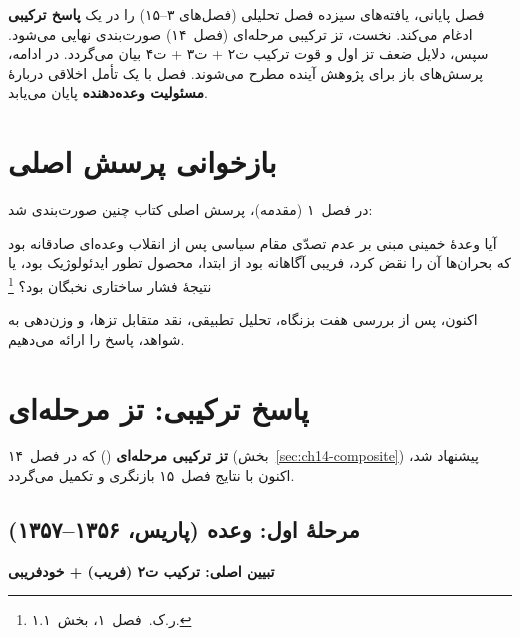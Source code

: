 \documentclass[12pt,a4paper]{book}
\newcommand{\keyword}[1]{\textbf{\textcolor{cPrimary}{#1}}}
\newcommand{\en}[1]{\lr{\textit{#1}}}
\begin{document}
\begin{infoBox}
فصل پایانی، یافته‌های سیزده فصل تحلیلی
(فصل‌های ۳–۱۵) را در یک \keyword{پاسخ ترکیبی} ادغام می‌کند.
نخست، تز ترکیبی مرحله‌ای (فصل~۱۴) صورت‌بندی نهایی می‌شود.
سپس، دلایل ضعف تز اول و قوت ترکیب ت‌۲ + ت‌۳ + ت‌۴ بیان می‌گردد.
در ادامه، پرسش‌های باز برای پژوهش آینده مطرح می‌شوند.
فصل با یک تأمل اخلاقی دربارهٔ \keyword{مسئولیت وعده‌دهنده} پایان می‌یابد.
\end{infoBox}

\section{بازخوانی پرسش اصلی}
\label{sec:ch16-question}

در فصل~۱ (مقدمه)، پرسش اصلی کتاب چنین صورت‌بندی شد:

\begin{warningBox}
آیا وعدهٔ خمینی مبنی بر عدم تصدّی مقام سیاسی پس از انقلاب
وعده‌ای صادقانه بود که بحران‌ها آن را نقض کرد،
فریبی آگاهانه بود از ابتدا،
محصول تطور ایدئولوژیک بود،
یا نتیجهٔ فشار ساختاری نخبگان بود؟%
\footnote{ر.ک.\ فصل~۱، بخش~۱.۱.}
\end{warningBox}

اکنون، پس از بررسی هفت بزنگاه، تحلیل تطبیقی، نقد متقابل تزها،
و وزن‌دهی به شواهد، پاسخ را ارائه می‌دهیم.

\section{پاسخ ترکیبی: تز مرحله‌ای}
\label{sec:ch16-composite}

\keyword{تز ترکیبی مرحله‌ای}
(\en{Phased Composite Thesis})
که در فصل~۱۴ (بخش~\ref{sec:ch14-composite}) پیشنهاد شد،
اکنون با نتایج فصل~۱۵ بازنگری و تکمیل می‌گردد.

\subsection{مرحلهٔ اول: وعده (پاریس، ۱۳۵۶–۱۳۵۷)}

\textbf{تبیین اصلی: ترکیب ت‌۲ (فریب) + خودفریبی}
\end{document}
